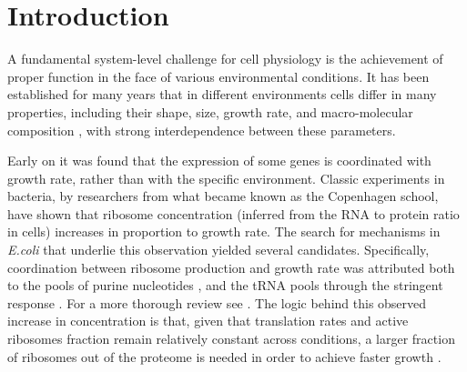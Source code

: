 \section{Introduction}
A fundamental system-level challenge for cell physiology is the achievement of proper function in the face of various environmental conditions.
It has been established for many years that in different environments cells differ in many properties, including their shape, size, growth rate, and macro-molecular composition \cite{Schaechter1958,Maaloe1969,Churchward1982,Pedersen1978a,ingraham1983growth,Bremer1987}, with strong interdependence between these parameters.


Early on it was found that the expression of some genes is coordinated with growth rate, rather than with the specific environment.
Classic experiments in bacteria, by researchers from what became known as the Copenhagen school, have shown that ribosome concentration (inferred from the RNA to protein ratio in cells) increases in proportion to growth rate\cite{Schaechter1958}.
The search for mechanisms in \emph{E.coli} that underlie this observation yielded several candidates.
Specifically, coordination between ribosome production and growth rate was attributed both to the pools of purine nucleotides \cite{Gourse1996,Gaal1997}, and the tRNA pools through the stringent response \cite{Chatterji2001,Brauer2008a}.
For a more thorough review see \cite{Nomura1984}.
The logic behind this observed increase in concentration is that, given that translation rates and active ribosomes fraction remain relatively constant across conditions, a larger fraction of ribosomes out of the proteome is needed in order to achieve faster growth \cite{Neidhardt1999,Dennis2004,Zaslaver2009}.


